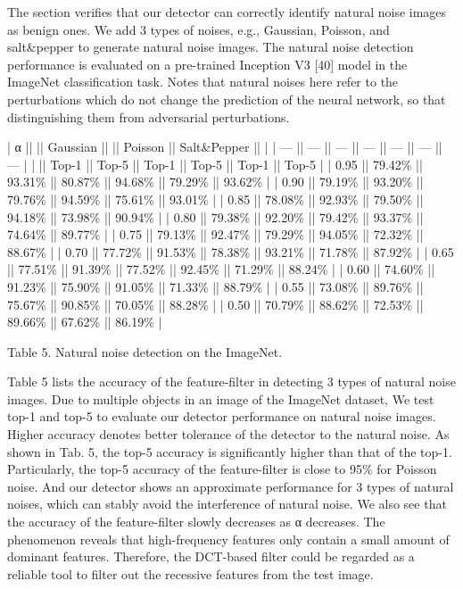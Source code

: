 \documentclass{article}
\begin{document}
The section verifies that our detector can correctly identify natural noise images as benign ones. We add 3 types of noises, e.g., Gaussian, Poisson, and salt\&pepper to generate natural noise images. The natural noise detection performance is evaluated on a pre-trained Inception V3 [40] model in the ImageNet classification task. Notes that natural noises here refer to the perturbations which do not change the prediction of the neural network, so that distinguishing them from adversarial perturbations.

| α    ||        || Gaussian ||        || Poisson || Salt\&Pepper ||        |
| ---  || ---    || ---      || ---    || ---     || ---         || ---    |
|      || Top-1  || Top-5    || Top-1  || Top-5   || Top-1       || Top-5  |
| 0.95 || 79.42\% || 93.31\%   || 80.87\% || 94.68\%  || 79.29\%      || 93.62\% |
| 0.90 || 79.19\% || 93.20\%   || 79.76\% || 94.59\%  || 75.61\%      || 93.01\% |
| 0.85 || 78.08\% || 92.93\%   || 79.50\% || 94.18\%  || 73.98\%      || 90.94\% |
| 0.80 || 79.38\% || 92.20\%   || 79.42\% || 93.37\%  || 74.64\%      || 89.77\% |
| 0.75 || 79.13\% || 92.47\%   || 79.29\% || 94.05\%  || 72.32\%      || 88.67\% |
| 0.70 || 77.72\% || 91.53\%   || 78.38\% || 93.21\%  || 71.78\%      || 87.92\% |
| 0.65 || 77.51\% || 91.39\%   || 77.52\% || 92.45\%  || 71.29\%      || 88.24\% |
| 0.60 || 74.60\% || 91.23\%   || 75.90\% || 91.05\%  || 71.33\%      || 88.79\% |
| 0.55 || 73.08\% || 89.76\%   || 75.67\% || 90.85\%  || 70.05\%      || 88.28\% |
| 0.50 || 70.79\% || 88.62\%   || 72.53\% || 89.66\%  || 67.62\%      || 86.19\% |

Table 5. Natural noise detection on the ImageNet.

Table 5 lists the accuracy of the feature-filter in detecting 3 types of natural noise images. Due to multiple objects in an image of the ImageNet dataset, We test top-1 and top-5 to evaluate our detector performance on natural noise images. Higher accuracy denotes better tolerance of the detector to the natural noise. As shown in Tab. 5, the top-5 accuracy is significantly higher than that of the top-1. Particularly, the top-5 accuracy of the feature-filter is close to 95\% for Poisson noise. And our detector shows an approximate performance for 3 types of natural noises, which can stably avoid the interference of natural noise. We also see that the accuracy of the feature-filter slowly decreases as α decreases. The phenomenon reveals that high-frequency features only contain a small amount of dominant features. Therefore, the DCT-based filter could be regarded as a reliable tool to filter out the recessive features from the test image.
\end{document}
